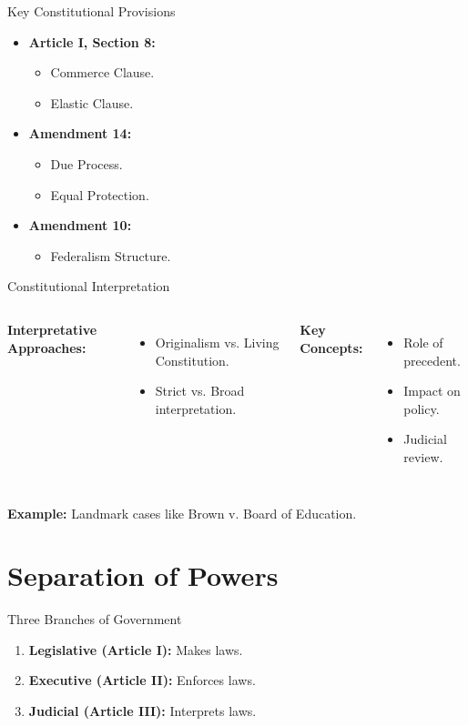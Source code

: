 \documentclass[12pt]{beamer}
\begin{document}
\begin{frame}{Key Constitutional Provisions}
    \begin{itemize}
        \item \textbf{Article I, Section 8:}
        \begin{itemize}
            \item Commerce Clause.
            \item Elastic Clause.
        \end{itemize}
        \item \textbf{Amendment 14:}
        \begin{itemize}
            \item Due Process.
            \item Equal Protection.
        \end{itemize}
        \item \textbf{Amendment 10:}
        \begin{itemize}
            \item Federalism Structure.
        \end{itemize}
    \end{itemize}
\end{frame}

\begin{frame}{Constitutional Interpretation}
    \begin{columns}
        \textbf{Interpretative Approaches:}
        \begin{itemize}
            \item Originalism vs. Living Constitution.
            \item Strict vs. Broad interpretation.
        \end{itemize}
        
        \textbf{Key Concepts:}
        \begin{itemize}
            \item Role of precedent.
            \item Impact on policy.
            \item Judicial review.
        \end{itemize}
    \end{columns}
    \textbf{Example:} Landmark cases like Brown v. Board of Education.
\end{frame}

\section{Separation of Powers}
\begin{frame}{Three Branches of Government}
    \begin{enumerate}
        \item \textbf{Legislative (Article I):} Makes laws.
        \item \textbf{Executive (Article II):} Enforces laws.
        \item \textbf{Judicial (Article III):} Interprets laws.
    \end{enumerate}
\end{frame}
\end{document}
